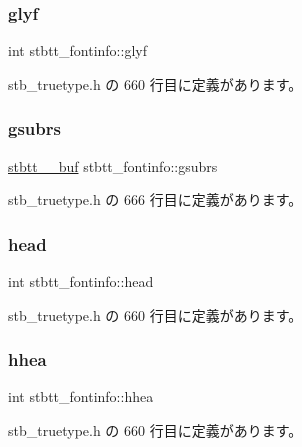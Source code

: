 \subsubsection{\texorpdfstring{glyf}{glyf}}
{\footnotesize\ttfamily int stbtt\+\_\+fontinfo\+::glyf}



 stb\+\_\+truetype.\+h の 660 行目に定義があります。

\mbox{\label{structstbtt__fontinfo_afc5bfc4a52ad0e3879f0f81a372da7fb}} 
\subsubsection{\texorpdfstring{gsubrs}{gsubrs}}
{\footnotesize\ttfamily \mbox{\hyperlink{structstbtt____buf}{stbtt\+\_\+\+\_\+buf}} stbtt\+\_\+fontinfo\+::gsubrs}



 stb\+\_\+truetype.\+h の 666 行目に定義があります。

\mbox{\label{structstbtt__fontinfo_ab76ed2f4cbd8fcbd8465ca5f88e7e2b9}} 
\subsubsection{\texorpdfstring{head}{head}}
{\footnotesize\ttfamily int stbtt\+\_\+fontinfo\+::head}



 stb\+\_\+truetype.\+h の 660 行目に定義があります。

\mbox{\label{structstbtt__fontinfo_a91b82ae03d68892eb7f3fbd3a8b990e5}} 
\subsubsection{\texorpdfstring{hhea}{hhea}}
{\footnotesize\ttfamily int stbtt\+\_\+fontinfo\+::hhea}



 stb\+\_\+truetype.\+h の 660 行目に定義があります。

